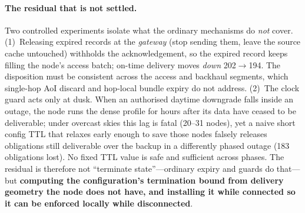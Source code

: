 \documentclass[11pt]{article}
\begin{document}
\paragraph{The residual that is not settled.}
Two controlled experiments isolate what the ordinary mechanisms do \emph{not} cover.
(1)~Releasing expired records at the \emph{gateway} (stop sending them, leave the source cache
untouched) withholds the acknowledgement, so the expired record keeps filling the node's access
batch; on-time delivery moves \emph{down} 202$\to$194. The disposition must be consistent across
the access and backhaul segments, which single-hop AoI discard and hop-local bundle expiry do not
address. (2)~The clock guard acts only at dusk. When an authorised daytime downgrade falls inside an
outage, the node runs the dense profile for hours after its data have ceased to be deliverable;
under overcast skies this lag is fatal (20--31 nodes), yet a naive short config TTL that relaxes
early enough to save those nodes falsely releases obligations still deliverable over the backup in
a differently phased outage (183 obligations lost). No fixed TTL value is safe and sufficient across
phases. The residual is therefore not ``terminate state''---ordinary expiry and guards do
that---but \textbf{computing the configuration's termination bound from delivery geometry the node
does not have, and installing it while connected so it can be enforced locally while disconnected}.
\end{document}
